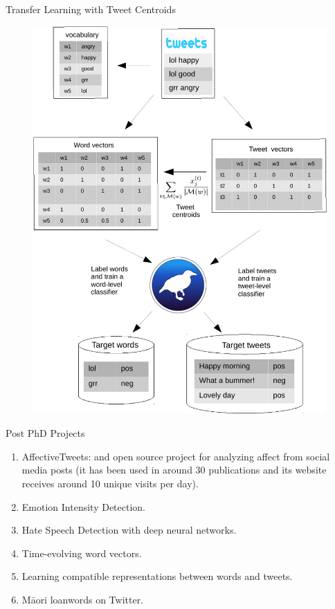 \documentclass[handout]{beamer}
\begin{document}
\begin{frame}{Transfer Learning with Tweet Centroids}

\begin{figure}[htb]
	\centering
	 \includegraphics[scale=0.4]{pics/tweetsToWords.pdf}
\end{figure}



\end{frame}









\begin{frame}{Post PhD Projects}

\begin{enumerate}
 \item AffectiveTweets: and open source project for analyzing affect from social media posts (it has been used in around 30 publications and its website receives around 10 unique visits per day).
 \item Emotion Intensity Detection.
 \item Hate Speech Detection with deep neural networks.
 \item Time-evolving word vectors.
 \item Learning compatible representations between words and tweets.
 \item M\={a}ori loanwords on Twitter.
 \end{enumerate}

\end{frame}
\end{document}
